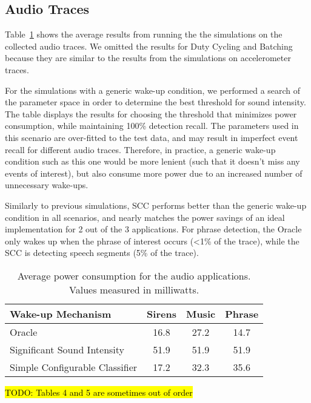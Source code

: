 \subsection{Audio Traces}

Table~\ref{table:macrobenchmarksAudio} shows the average results from running the
the simulations on the collected audio traces.  We omitted the results
for Duty Cycling and Batching because they are similar to the results from
the simulations on accelerometer traces.

For the simulations with a generic wake-up condition, we performed a search
of the parameter space in order to determine the best threshold for sound 
intensity.  The table displays the results for choosing the threshold that
minimizes power consumption, while maintaining 100\% detection recall.
The parameters used in this scenario are over-fitted to the test data, and 
may result in imperfect event recall for different audio traces.  Therefore, 
in practice, a generic wake-up condition such as this one would be more 
lenient (such that it doesn't miss any events of interest), but also consume
more power due to an increased number of unnecessary wake-ups.

Similarly to previous simulations, SCC performs better than the generic
wake-up condition in all scenarios, and nearly matches the power savings of an ideal 
implementation for 2 out of the 3 applications.  For phrase detection, the Oracle
only wakes up when the phrase of interest occurs (<1\% of the trace), while
the SCC is detecting speech segments (5\% of the trace).

\bgroup
\def\arraystretch{1.5}
\begin{table}[t]
\centering
{\small
	\begin{tabular}{|l|c|c|c|}
	\hline
	\textbf{Wake-up Mechanism}     & \textbf{Sirens}   & \textbf{Music}   & \textbf{Phrase} \\ \hline
	Oracle                         & 16.8              & 27.2             & 14.7            \\ \hline
	Significant Sound Intensity    & 51.9              & 51.9             & 51.9            \\ \hline
	Simple Configurable Classifier & 17.2              & 32.3             & 35.6            \\ \hline         
	\end{tabular}
}
\caption{Average power consumption for the audio applications.  Values measured in milliwatts.}
\label{table:macrobenchmarksAudio}
\end{table}
\egroup

\hl{TODO: Tables 4 and 5 are sometimes out of order}
